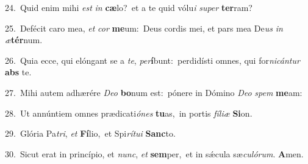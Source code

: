 {\numbfont\textcolor{\numbcolor}{24.}}~Quid enim mihi \textit{est} \textit{in} \textbf{cæ}\-lo?~\star et a te quid vólu\textit{i} \textit{su}\-\textit{per} \textbf{ter}\-ram?\par
{\numbfont\textcolor{\numbcolor}{25.}}~Defécit caro mea, \textit{et} \textit{cor} \textbf{me}\-um:~\star Deus cordis mei, et pars mea De\textit{us} \textit{in} \textit{æ}\-\textbf{tér}num.\par
{\numbfont\textcolor{\numbcolor}{26.}}~Quia ecce, qui elóngant se a \textit{te}\-, \textit{per}\-\textbf{í}bunt:~\star perdidísti omnes, qui for\-\textit{ni}\-\textit{cán}\textit{tur} \textbf{abs} te.\par
{\numbfont\textcolor{\numbcolor}{27.}}~Mihi autem adhærére \textit{De}\-\textit{o} \textbf{bo}\-num est:~\star pónere in Dómino \textit{De}\-\textit{o} \textit{spem} \textbf{me}\-am:\par
{\numbfont\textcolor{\numbcolor}{28.}}~Ut annúntiem omnes prædicati\-\textit{ó}\-\textit{nes} \textbf{tu}\-as,~\star in portis \textit{fí}\-\textit{li}\textit{æ} \textbf{Si}\-on.\par
{\numbfont\textcolor{\numbcolor}{29.}}~Glória Pa\-\textit{tri}\-, \textit{et} \textbf{Fí}\-lio,~\star et Spi\-\textit{rí}\-\textit{tu}\textit{i} \textbf{Sanc}\-to.\par
{\numbfont\textcolor{\numbcolor}{30.}}~Sicut erat in princípio, et \textit{nunc}\-, \textit{et} \textbf{sem}\-per,~\star et in sǽcula sæ\-\textit{cu}\-\textit{ló}\textit{rum}. \textbf{A}\-men.\par
